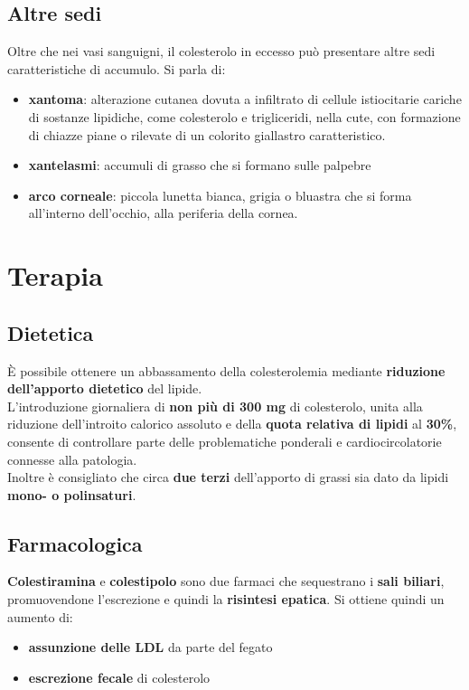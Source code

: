 \documentclass[a4paper, 12pt]{article}
\begin{document}
\begin{titlepage}
\subsection{Altre sedi}
Oltre che nei vasi sanguigni, il colesterolo in eccesso può presentare altre sedi caratteristiche di accumulo. Si parla di:
\begin{itemize}
\item \textbf{xantoma}: alterazione cutanea dovuta a infiltrato di cellule istiocitarie cariche di sostanze lipidiche, come colesterolo e trigliceridi, nella cute, con formazione di chiazze piane o rilevate di un colorito giallastro caratteristico.
\item \textbf{xantelasmi}: accumuli di grasso che si formano sulle palpebre
\item \textbf{arco corneale}: piccola lunetta bianca, grigia o bluastra che si forma all’interno dell’occhio, alla periferia della cornea.
\end{itemize}

\section{Terapia}

\subsection{Dietetica}
È possibile ottenere un abbassamento della colesterolemia mediante \textbf{riduzione dell'apporto dietetico} del lipide.\\
L'introduzione giornaliera di \textbf{non più di 300 mg} di colesterolo, unita alla riduzione dell'introito calorico assoluto e della \textbf{quota relativa di lipidi} al \textbf{30\%}, consente di controllare parte delle problematiche ponderali e cardiocircolatorie connesse alla patologia.\\
Inoltre è consigliato che circa \textbf{due terzi} dell'apporto di grassi sia dato da lipidi \textbf{mono- o polinsaturi}.

\subsection{Farmacologica}

\textbf{Colestiramina} e \textbf{colestipolo} sono due farmaci che sequestrano i \textbf{sali biliari}, promuovendone l'escrezione e quindi la \textbf{risintesi epatica}. Si ottiene quindi un aumento di:
\begin{itemize}
\item \textbf{assunzione delle LDL} da parte del fegato
\item \textbf{escrezione fecale} di colesterolo
\end{itemize}


\end{titlepage}
\end{document}
